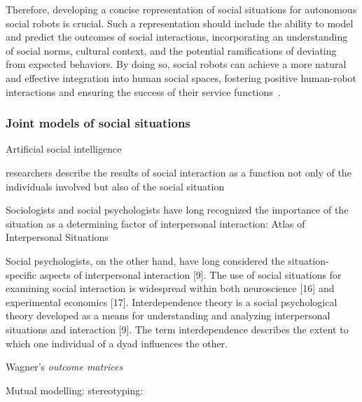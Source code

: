 Therefore, developing a concise representation of social situations for
autonomous social robots is crucial. Such a representation should include the
ability to model and predict the outcomes of social interactions, incorporating
an understanding of social norms, cultural context, and the potential
ramifications of deviating from expected behaviors. By doing so, social robots
can achieve a more natural and effective integration into human social spaces,
fostering positive human-robot interactions and ensuring the success of their
service functions~\cite{gockley2005designing}.


\subsubsection{Joint models of social situations}



Artificial social intelligence~\cite{bainbridge1994artificial}

researchers describe the results of social
interaction as a function not only of the individuals involved
but also of the social situation~\cite{rusbult2003interdependence}

Sociologists and social psychologists have long
recognized the importance of the situation as a determining
factor of interpersonal interaction: Atlas of Interpersonal Situations~\cite{kelley2003atlas}

Social psychologists, on the other hand, have long
considered the situation-specific aspects of interpersonal
interaction [9]. The use of social situations for examining
social interaction is widespread within both neuroscience [16]
and experimental economics [17]. Interdependence theory is a
social psychological theory developed as a means for
understanding and analyzing interpersonal situations and
interaction [9]. The term interdependence describes the extent
to which one individual of a dyad influences the other.

Wagner's \emph{outcome matrices}
\cite{wagner2006framework} \cite{wagner2009creating}

Mutual modelling:
\cite{dillenbourg2016symmetry}
stereotyping: \cite{wagner2015robots}



